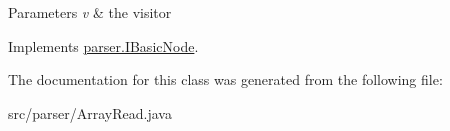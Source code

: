\begin{DoxyParams}{Parameters}
{\em v} & the visitor \\
\hline
\end{DoxyParams}


Implements \hyperlink{interfaceparser_1_1_i_basic_node_af8790b7076c59e00781ba3d4118757cd}{parser.\+I\+Basic\+Node}.



The documentation for this class was generated from the following file\+:\begin{DoxyCompactItemize}
\item 
src/parser/Array\+Read.\+java\end{DoxyCompactItemize}
